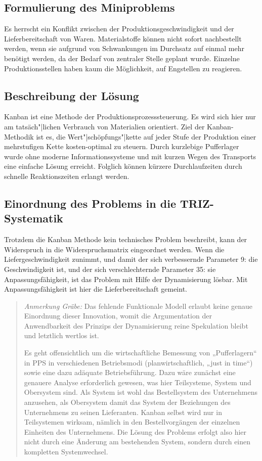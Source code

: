 \documentclass[11pt,a4paper]{article}
\newcommand{\HGG}[1]{\begin{quote} \emph{Anmerkung Gräbe:} #1  \end{quote}}
\begin{document}
\subsection{Formulierung des Miniproblems}
Es herrscht ein Konflikt zwischen der Produktionsgeschwindigkeit und der
Lieferbereitschaft von Waren.  Materialstoffe können nicht sofort nachbestellt
werden, wenn sie aufgrund von Schwankungen im Durchsatz auf einmal mehr
benötigt werden, da der Bedarf von zentraler Stelle geplant wurde. Einzelne
Produktionsstellen haben kaum die Möglichkeit, auf Engstellen zu reagieren.

\subsection{Beschreibung der Lösung}
Kanban ist eine Methode der Produktionsprozesssteuerung. Es wird sich hier nur
am tatsäch"|lichen Verbrauch von Materialien orientiert. Ziel der
Kanban-Methodik ist es, die Wert"|schöpfungs"|kette auf jeder Stufe der
Produktion einer mehrstufigen Kette kosten-optimal zu steuern. Durch
kurzlebige Pufferlager wurde ohne moderne Informationssysteme und mit kurzen
Wegen des Transports eine einfache Lösung erreicht.  Folglich können kürzere
Durchlaufzeiten durch schnelle Reaktionszeiten erlangt werden.

\subsection{Einordnung des Problems in die TRIZ-Systematik}
Trotzdem die Kanban Methode kein technisches Problem beschreibt, kann der
Widerspruch in die Widerspruchsmatrix eingeordnet werden.  Wenn die
Liefergeschwindigkeit zunimmt, und damit der sich verbessernde Parameter 9:
die Geschwindigkeit ist, und der sich verschlechternde Parameter 35: sie
Anpassungsfähigkeit, ist das Problem mit Hilfe der Dynamisierung lösbar.  Mit
Anpassungsfähigkeit ist hier die Lieferbereitschaft gemeint.

\HGG{Das fehlende Funktionale Modell erlaubt keine genaue Einordnung dieser
  Innovation, womit die Argumentation der Anwendbarkeit des Prinzips der
  Dynamisierung reine Spekulation bleibt und letztlich wertlos ist.

  Es geht offensichtlich um die wirtschaftliche Bemessung von „Pufferlagern“
  in PPS in verschiedenen Betriebsmodi (planwirtschaftlich, „just in time“)
  sowie eine dazu adäquate Betriebsführung.  Dazu wäre zunächst eine genauere
  Analyse erforderlich gewesen, was hier Teilsysteme, System und Obersystem
  sind.  Als System ist wohl das Bestellsystem des Unternehmens anzusehen, als
  Obersystem damit das System der Beziehungen des Unternehmens zu seinen
  Lieferanten.  Kanban selbst wird nur in Teilsystemen wirksam, nämlich in den
  Bestellvorgängen der einzelnen Einheiten des Unternehmens.  Die Lösung des
  Problems erfolgt also hier nicht durch eine Änderung am bestehenden System,
  sondern durch einen kompletten Systemwechsel.}
\end{document}
